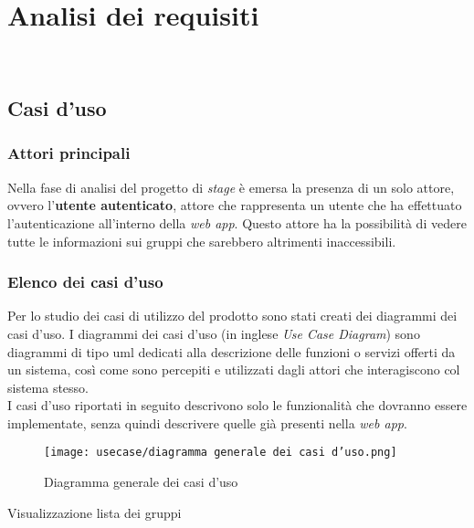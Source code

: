 
\chapter{Analisi dei requisiti}
\label{cap:analisi-requisiti}

\\

\section{Casi d'uso}
\subsection*{Attori principali}
Nella fase di analisi del progetto di \textit{stage} è emersa la presenza di un
solo attore, ovvero l'\textbf{utente autenticato},
attore che rappresenta un utente che ha effettuato l'autenticazione
all'interno della \textit{web app}. Questo attore ha la possibilità di
vedere
tutte le informazioni sui gruppi che sarebbero altrimenti inaccessibili.

\subsection*{Elenco dei casi d'uso}
Per lo studio dei casi di utilizzo del prodotto sono stati creati dei diagrammi
dei casi d'uso.
I diagrammi dei casi d'uso (in inglese \emph{Use Case Diagram}) sono diagrammi
di tipo \gls{uml} dedicati alla descrizione delle funzioni o servizi offerti da
un sistema, così come sono percepiti e utilizzati dagli attori che
interagiscono col sistema stesso.\\
I casi d'uso riportati in seguito descrivono solo le funzionalità che dovranno
essere implementate, senza quindi descrivere quelle già presenti nella
\textit{web app}.
\begin{figure}[H]
    \centering
    \texttt{[image: usecase/diagramma generale dei casi
        d'uso.png]}
    \caption{Diagramma generale dei casi d'uso}
\end{figure}

\begin{usecase}{Visualizzazione lista dei gruppi}
    \label{uc:scenario-visualizzazione-lista-gruppi}

\end{usecase}
\newpage

